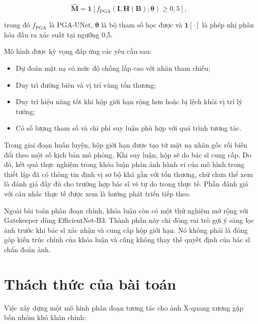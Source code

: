 \begin{equation}
    \widehat{\mathbf{M}}
    =
    \mathbf{1}
    \left[
        f_{\mathrm{PGA}}
        \left(
            \mathbf{I},
            \mathbf{H}(\mathbf{B});
            \boldsymbol{\theta}
        \right)
        \geq 0{,}5
    \right],
    \label{eq:problem_segmentation}
\end{equation}

trong đó $f_{\mathrm{PGA}}$ là PGA-UNet,
$\boldsymbol{\theta}$ là bộ tham số học được và
$\mathbf{1}[\cdot]$ là phép nhị phân hóa đầu ra xác suất tại ngưỡng 0,5.

Mô hình được kỳ vọng đáp ứng các yêu cầu sau:

\begin{itemize}
    \item Dự đoán mặt nạ có mức độ chồng lấp cao với nhãn tham chiếu;
    \item Duy trì đường biên và vị trí vùng tổn thương;
    \item Duy trì hiệu năng tốt khi hộp giới hạn rộng hơn hoặc bị lệch khỏi vị trí lý tưởng;
    \item Có số lượng tham số và chi phí suy luận phù hợp với quá trình tương tác.
\end{itemize}

Trong giai đoạn huấn luyện, hộp giới hạn được tạo từ mặt nạ nhãn gốc rồi biến đổi theo một số kịch bản mô phỏng. Khi suy luận, hộp sẽ do bác sĩ cung cấp. Do đó, kết quả thực nghiệm trong khóa luận phản ánh hành vi của mô hình trong thiết lập đã có thông tin định vị sơ bộ khá gần với tổn thương, chứ chưa thể xem là đánh giá đầy đủ cho trường hợp bác sĩ vẽ tự do trong thực tế. Phần đánh giá với câu nhắc thực tế được xem là hướng phát triển tiếp theo.

Ngoài bài toán phân đoạn chính, khóa luận còn có một thử nghiệm mở rộng với Gatekeeper dùng EfficientNet-B3. Thành phần này chỉ đóng vai trò gợi ý sàng lọc ảnh trước khi bác sĩ xác nhận và cung cấp hộp giới hạn. Nó không phải là đóng góp kiến trúc chính của khóa luận và cũng không thay thế quyết định của bác sĩ chẩn đoán ảnh.

\section{Thách thức của bài toán}
\label{sec:thach_thuc}

Việc xây dựng một mô hình phân đoạn tương tác cho ảnh X-quang xương gặp bốn nhóm khó khăn chính:

